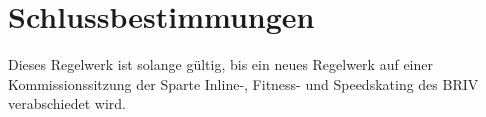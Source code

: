 \section{Schlussbestimmungen}
Dieses Regelwerk ist solange gültig, bis ein neues Regelwerk auf einer Kommissionssitzung der Sparte Inline-, Fitness- und Speedskating des BRIV verabschiedet wird.